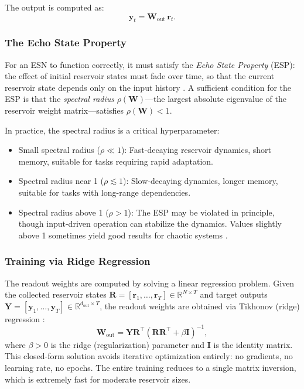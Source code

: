 The output is computed as:
\begin{equation}
    \mathbf{y}_t = \mathbf{W}_{\text{out}} \, \mathbf{r}_t.
    \label{eq:esn_output}
\end{equation}

\subsubsection{The Echo State Property}

For an ESN to function correctly, it must satisfy the \emph{Echo State Property} (ESP): the effect of initial reservoir states must fade over time, so that the current reservoir state depends only on the input history \cite{jaeger2001echo}. A sufficient condition for the ESP is that the \emph{spectral radius} $\rho(\mathbf{W})$---the largest absolute eigenvalue of the reservoir weight matrix---satisfies $\rho(\mathbf{W}) < 1$.

In practice, the spectral radius is a critical hyperparameter:
\begin{itemize}
    \item Small spectral radius ($\rho \ll 1$): Fast-decaying reservoir dynamics, short memory, suitable for tasks requiring rapid adaptation.
    \item Spectral radius near 1 ($\rho \lesssim 1$): Slow-decaying dynamics, longer memory, suitable for tasks with long-range dependencies.
    \item Spectral radius above 1 ($\rho > 1$): The ESP may be violated in principle, though input-driven operation can stabilize the dynamics. Values slightly above 1 sometimes yield good results for chaotic systems \cite{lukosevicius2012practical}.
\end{itemize}

\subsubsection{Training via Ridge Regression}

The readout weights are computed by solving a linear regression problem. Given the collected reservoir states $\mathbf{R} = [\mathbf{r}_1, \ldots, \mathbf{r}_T] \in \mathbb{R}^{N \times T}$ and target outputs $\mathbf{Y} = [\mathbf{y}_1, \ldots, \mathbf{y}_T] \in \mathbb{R}^{d_{\text{out}} \times T}$, the readout weights are obtained via Tikhonov (ridge) regression \cite{tikhonov1963solution}:
\begin{equation}
    \mathbf{W}_{\text{out}} = \mathbf{Y} \mathbf{R}^\top (\mathbf{R} \mathbf{R}^\top + \beta \mathbf{I})^{-1},
    \label{eq:ridge}
\end{equation}
where $\beta > 0$ is the ridge (regularization) parameter and $\mathbf{I}$ is the identity matrix. This closed-form solution avoids iterative optimization entirely: no gradients, no learning rate, no epochs. The entire training reduces to a single matrix inversion, which is extremely fast for moderate reservoir sizes.

